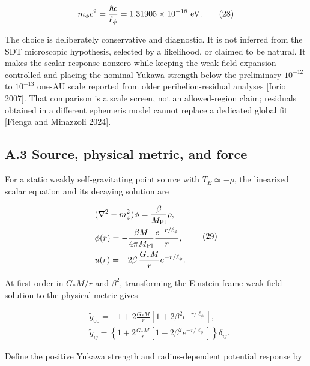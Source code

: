 \documentclass[
  american,
  11pt,
  letterpaper,
]{article}
\begin{document}
\begin{equation}
m_\phi c^2=\frac{\hbar c}{\ell_\phi}
=1.31905\times10^{-18}\ {\rm eV}.
\tag{28}
\end{equation}

The choice is deliberately conservative and diagnostic. It is not inferred from the SDT microscopic hypothesis, selected by a likelihood, or claimed to be natural. It makes the scalar response nonzero while keeping the weak-field expansion controlled and placing the nominal Yukawa strength below the preliminary \(10^{-12}\) to \(10^{-13}\) one-AU scale reported from older perihelion-residual analyses {[}Iorio 2007{]}. That comparison is a scale screen, not an allowed-region claim; residuals obtained in a different ephemeris model cannot replace a dedicated global fit {[}Fienga and Minazzoli 2024{]}.

\subsection{A.3 Source, physical metric, and force}\label{a.3-source-physical-metric-and-force}

For a static weakly self-gravitating point source with \(T_E\simeq-\rho\), the linearized scalar equation and its decaying solution are

\begin{equation}
\begin{aligned}
& (\nabla^2-m_\phi^2)\phi=\frac{\beta}{M_{\rm Pl}}\rho, \\
& \phi(r)=-\frac{\beta M}{4\pi M_{\rm Pl}}\frac{e^{-r/\ell_\phi}}{r}, \\
& u(r)=-2\beta\,\frac{G_*M}{r}e^{-r/\ell_\phi}.
\end{aligned}
\tag{29}
\end{equation}

At first order in \(G_*M/r\) and \(\beta^2\), transforming the Einstein-frame weak-field solution to the physical metric gives

\begin{equation}
\begin{aligned}
& \widetilde g_{00}
=-1+2\frac{G_*M}{r}\!\left[1+2\beta^2e^{-r/\ell_\phi}\right], \\
& \widetilde g_{ij}
=\left\{1+2\frac{G_*M}{r}
\!\left[1-2\beta^2e^{-r/\ell_\phi}\right]\right\}\delta_{ij}.
\end{aligned}
\tag{30}
\end{equation}

Define the positive Yukawa strength and radius-dependent potential response by
\end{document}
